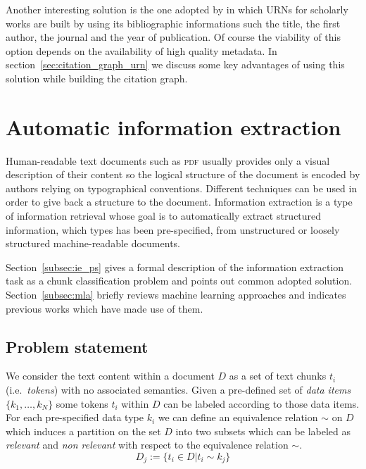 Another interesting solution is the one adopted by \cite{bergmark2000aer} in which URNs for scholarly works are built by using its bibliographic informations such the title, the first author, the journal and the year of publication. Of course the viability of this option depends on the availability of high quality metadata. In section~\ref{sec:citation_graph_urn} we discuss some key advantages of using this solution while building the citation graph.



\section{\label{sec:automatic_ie}Automatic information extraction}
Human-readable text documents such as \textsc{pdf} usually provides only a visual description of their content so the logical structure of the document is encoded by authors relying on typographical conventions. Different techniques can be used in order to give back a structure to the document. Information extraction is a type of information retrieval whose goal is to automatically extract structured information, which types has been pre-specified, from unstructured or loosely structured machine-readable documents.

Section~\ref{subsec:ie_ps} gives a formal description of the information extraction task as a chunk classification problem and points out common adopted solution. Section~\ref{subsec:mla} briefly reviews machine learning approaches and indicates previous works which have made use of them.

\subsection{\label{subsec:ie_ps}Problem statement}
We consider the text content within a document $D$ as a set of text chunks $t_i$ (i.e.\ \emph{tokens}) with no associated semantics. Given a pre-defined set of \emph{data items} $\{k_1, \ldots, k_N\}$ some tokens $t_i$ within $D$ can be labeled according to those data items. For each pre-specified data type $k_i$ we can define an equivalence relation $\sim$ on $D$ which induces a partition on the set $D$ into two subsets which can be labeled as \emph{relevant} and \emph{non relevant} with respect to the equivalence relation $\sim$.
\begin{equation}\label{eq:equivalence_relation}
 D_j := \{t_i \in D | t_i \sim k_j\}
\end{equation}

